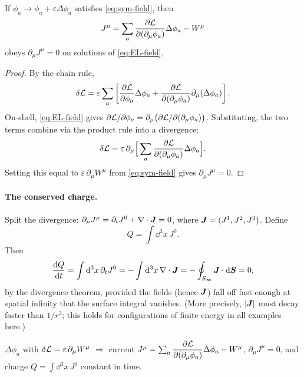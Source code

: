 \documentclass[11pt]{article}
\newcommand{\eps}{\varepsilon}
\begin{document}
\begin{theorem}\label{thm:noether-field}
If $\phi_a\to\phi_a+\eps\Delta\phi_a$ satisfies \eqref{eq:sym-field}, then
\begin{equation}
  J^\mu=\sum_a\frac{\partial \mathcal{L}}{\partial (\partial_\mu\phi_a)}\Delta\phi_a-W^\mu
\end{equation}
obeys $\partial_\mu J^\mu=0$ on solutions of \eqref{eq:EL-field}.
\end{theorem}

\begin{proof}
By the chain rule,
\begin{equation}
  \delta\Lag=\eps\sum_a\left[\pdiff{\Lag}{\phi_a}\Delta\phi_a+\pdiff{\Lag}{(\partial_\mu\phi_a)}\partial_\mu(\Delta\phi_a)\right].
\end{equation}
On-shell, \eqref{eq:EL-field} gives $\partial\mathcal{L}/\partial\phi_a=\partial_\mu\big(\partial\mathcal{L}/\partial(\partial_\mu\phi_a)\big)$. Substituting, the two terms combine via the product rule into a divergence:
\begin{equation}
  \delta\Lag=\eps\,\partial_\mu\Big[\sum_a\pdiff{\Lag}{(\partial_\mu\phi_a)}\Delta\phi_a\Big].
\end{equation}
Setting this equal to $\eps\,\partial_\mu W^\mu$ from \eqref{eq:sym-field} gives $\partial_\mu J^\mu=0$.
\end{proof}

\paragraph{The conserved charge.} Split the divergence: $\partial_\mu J^\mu=\partial_tJ^0+\nabla\cdot\bm{J}=0$, where $\bm{J}=(J^1,J^2,J^3)$. Define
\begin{equation}
  Q=\int\dd^3x\,J^0 .
\end{equation}
Then
\begin{equation}
  \frac{\mathrm{d} Q}{\mathrm{d} t}=\int\mathrm{d}^3x\,\partial_tJ^0=-\int\mathrm{d}^3x\,\nabla\cdot\bm{J}=-\oint_{S_\infty}\bm{J}\cdot\mathrm{d}\bm{S}=0,
\end{equation}
by the divergence theorem, provided the fields (hence $\bm{J}$) fall off fast enough at spatial infinity that the surface integral vanishes. (More precisely, $|\bm{J}|$ must decay faster than $1/r^2$; this holds for configurations of finite energy in all examples here.)

\begin{keyresult}
$\Delta\phi_a$ with $\delta\Lag=\eps\,\partial_\mu W^\mu$ $\Rightarrow$ current $J^\mu=\sum_a\dfrac{\partial\mathcal{L}}{\partial(\partial_\mu\phi_a)}\Delta\phi_a-W^\mu$, $\partial_\mu J^\mu=0$, and charge $Q=\int\dd^3x\,J^0$ constant in time.
\end{keyresult}
\end{document}

